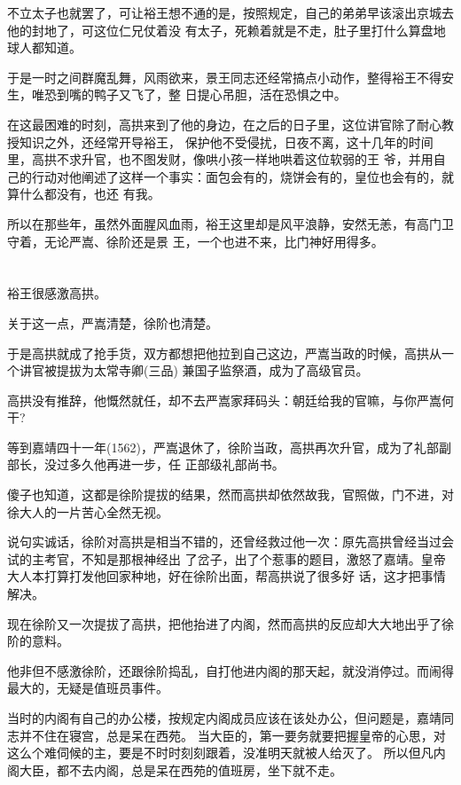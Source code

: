 \documentclass[11pt,a4paper,onecolumn]{article}
\begin{document}
不立太子也就罢了，可让裕王想不通的是，按照规定，自己的弟弟早该滚出京城去他的封地了，可这位仁兄仗着没
有太子，死赖着就是不走，肚子里打什么算盘地球人都知道。

于是一时之间群魔乱舞，风雨欲来，景王同志还经常搞点小动作，整得裕王不得安生，唯恐到嘴的鸭子又飞了，整
日提心吊胆，活在恐惧之中。

在这最困难的时刻，高拱来到了他的身边，在之后的日子里，这位讲官除了耐心教授知识之外，还经常开导裕王，
保护他不受侵扰，日夜不离，这十几年的时间里，高拱不求升官，也不图发财，像哄小孩一样地哄着这位软弱的王
爷，并用自己的行动对他阐述了这样一个事实：面包会有的，烧饼会有的，皇位也会有的，就算什么都没有，也还
有我。

所以在那些年，虽然外面腥风血雨，裕王这里却是风平浪静，安然无恙，有高门卫守着，无论严嵩、徐阶还是景
王，一个也进不来，比门神好用得多。

\section[\thesection]{}

裕王很感激高拱。

关于这一点，严嵩清楚，徐阶也清楚。

于是高拱就成了抢手货，双方都想把他拉到自己这边，严嵩当政的时候，高拱从一个讲官被提拔为太常寺卿(三品)
兼国子监祭酒，成为了高级官员。

高拱没有推辞，他慨然就任，却不去严嵩家拜码头：朝廷给我的官嘛，与你严嵩何干?

等到嘉靖四十一年(1562)，严嵩退休了，徐阶当政，高拱再次升官，成为了礼部副部长，没过多久他再进一步，任
正部级礼部尚书。

傻子也知道，这都是徐阶提拔的结果，然而高拱却依然故我，官照做，门不进，对徐大人的一片苦心全然无视。

说句实诚话，徐阶对高拱是相当不错的，还曾经救过他一次：原先高拱曾经当过会试的主考官，不知是那根神经出
了岔子，出了个惹事的题目，激怒了嘉靖。皇帝大人本打算打发他回家种地，好在徐阶出面，帮高拱说了很多好
话，这才把事情解决。

现在徐阶又一次提拔了高拱，把他抬进了内阁，然而高拱的反应却大大地出乎了徐阶的意料。

他非但不感激徐阶，还跟徐阶捣乱，自打他进内阁的那天起，就没消停过。而闹得最大的，无疑是值班员事件。

当时的内阁有自己的办公楼，按规定内阁成员应该在该处办公，但问题是，嘉靖同志并不住在寝宫，总是呆在西苑。
当大臣的，第一要务就要把握皇帝的心思，对这么个难伺候的主，要是不时时刻刻跟着，没准明天就被人给灭了。
所以但凡内阁大臣，都不去内阁，总是呆在西苑的值班房，坐下就不走。
\end{document}
